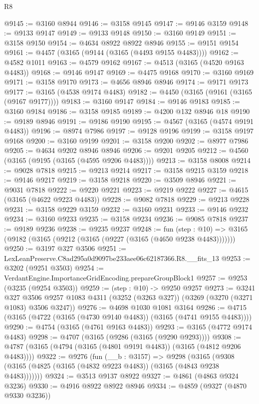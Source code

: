 \begin{lexlean}{R8}
\begin{coremodule}
@9145 := @3160 @8944
@9146 := @3158 @9145
@9147 := @9146 @3159
@9148 := @9133 @9147
@9149 := @9133 @9148
@9150 := @3160 @9149
@9151 := @3158 @9150
@9154 := @4634 @8922 @8922 @8946
@9155 := @9151 @9154
@9161 := @4457 (@3165 (@9144 (@3165 (@4493 @9155 @4483))))
@9162 := @4582 @1011
@9163 := @4579 @9162
@9167 := @4513 (@3165 (@4520 @9163 @4483))
@9168 := @9146 @9147
@9169 := @4475 @9168
@9170 := @3160 @9169
@9171 := @3158 @9170
@9173 := @4656 @8946 @8946
@9174 := @9171 @9173
@9177 := @3165 (@4538 @9174 @4483)
@9182 := @4450 (@3165 (@9161 (@3165 (@9167 @9177))))
@9183 := @3160 @9147
@9184 := @9146 @9183
@9185 := @3160 @9184
@9186 := @3158 @9185
@9189 := @4200 @132 @8946 @18
@9190 := @9189 @8946
@9191 := @9186 @9190
@9195 := @4567 (@3165 (@4574 @9191 @4483))
@9196 := @8974 @7986
@9197 := @9128 @9196
@9199 := @3158 @9197 @9168
@9200 := @3160 @9199
@9201 := @3158 @9200
@9202 := @8977 @7986
@9205 := @4634 @9202 @8946 @8946
@9206 := @9201 @9205
@9212 := @4560 (@3165 (@9195 (@3165 (@4595 @9206 @4483))))
@9213 := @3158 @8008
@9214 := @9028 @7818
@9215 := @9213 @9214
@9217 := @3158 @9215 @3159
@9218 := @9146 @9217
@9219 := @3158 @9218
@9220 := @3509 @8946
@9221 := @9031 @7818
@9222 := @9220 @9221
@9223 := @9219 @9222
@9227 := @4615 (@3165 (@4622 @9223 @4483))
@9228 := @9082 @7818
@9229 := @9213 @9228
@9231 := @3158 @9229 @3159
@9232 := @3160 @9231
@9233 := @9146 @9232
@9234 := @3160 @9233
@9235 := @3158 @9234
@9236 := @9085 @7818
@9237 := @9189 @9236
@9238 := @9235 @9237
@9248 := fun (step : @10) =>
  @3165 (@9182 (@3165 (@9212 (@3165 (@9227 (@3165 (@4650 @9238 @4483)))))))
@9250 := @3197 @327 @3506
@9251 := LexLeanPreserve.C8ad295a0d9097be233aee06c62187366.R8.__fits_13
@9253 := @3202 (@9251 @3503)
@9254 := VerdantEngine.ImportanceGridEncoding.prepareGroupBlock1
@9257 := @9253 (@3235 (@9254 @3503))
@9259 := (step : @10) -> @9250 @9257
@9273 := @3241
    @327
    @3506
    @9257
    @1083
    @4311
    (@3252 (@3263 @327))
    (@3269 (@3270 (@3271 @1083) @3506 @3247))
@9276 := @4698 @1030 @1081 @3164
@9286 := @4715 (@3165 (@4722 (@3165 (@4730 @9140 @4483)) (@3165 (@4741 @9155 @4483))))
@9290 := @4754 (@3165 (@4761 @9163 @4483))
@9293 := @3165 (@4772 @9174 @4483)
@9298 := @4707 (@3165 (@9286 (@3165 (@9290 @9293))))
@9308 := @4787 (@3165 (@4794 (@3165 (@4801 @9191 @4483)) (@3165 (@4812 @9206 @4483))))
@9322 := @9276
    (fun (__b : @3157) =>
    @9298 (@3165 (@9308 (@3165 (@4825 (@3165 (@4832 @9223 @4483)) (@3165 (@4843 @9238 @4483)))))))
@9324 := @3513 @9137 @8922
@9327 := @4861 (@4863 @9324 @3236)
@9330 := @4916 @8922 @8922 @8946
@9334 := @4859 (@9327 (@4870 @9330 @3236))

\end{coremodule}
\end{lexlean}

